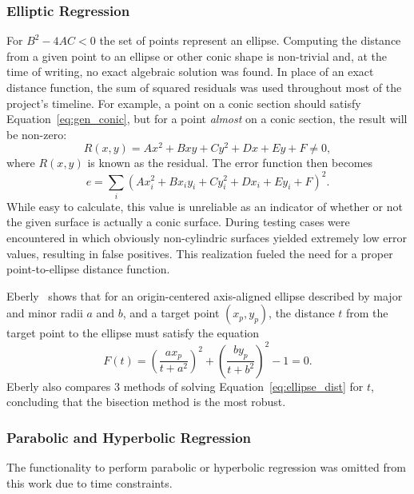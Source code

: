 \subsubsection{Elliptic Regression}\label{sec:elliptic_reg}
For $B^2 - 4AC < 0$ the set of points represent an ellipse.
Computing the distance from a given point to an ellipse or other conic shape is non-trivial and, at the time of writing, no exact algebraic solution was found.
In place of an exact distance function, the sum of squared residuals was used throughout most of the project's timeline.
For example, a point on a conic section should satisfy Equation~\ref{eq:gen_conic}, but for a point \textit{almost} on a conic section, the result will be non-zero:
\begin{equation}
	R(x,y) = Ax^2 + Bxy + Cy^2 + Dx + Ey + F \neq 0,
\end{equation}
where $R(x,y)$ is known as the residual. The error function then becomes
\begin{equation}\label{eq:sq_residual}
	e = \sum_i \left(Ax_i^2 + Bx_i y_i + Cy_i^2 + Dx_i + Ey_i + F\right)^2.
\end{equation}
While easy to calculate, this value is unreliable as an indicator of whether or not the given surface is actually a conic surface.
During testing cases were encountered in which obviously non-cylindric surfaces yielded extremely low error values, resulting in false positives.
This realization fueled the need for a proper point-to-ellipse distance function.

Eberly~\cite{GeoTools_pt_to_ellipse} shows that for an origin-centered axis-aligned ellipse described by major and minor radii $a$ and $b$, and a target point $(x_p, y_p)$, the distance $t$ from the target point to the ellipse must satisfy the equation
\begin{equation}\label{eq:ellipse_dist}
	F(t) = \left(\frac{a x_p}{t + a^2}\right)^2 + \left(\frac{b y_p}{t + b^2}\right)^2 - 1 = 0.
\end{equation}
Eberly also compares 3 methods of solving Equation~\ref{eq:ellipse_dist} for $t$, concluding that the bisection method is the most robust.

\subsubsection{Parabolic and Hyperbolic Regression}
The functionality to perform parabolic or hyperbolic regression was omitted from this work due to time constraints.

